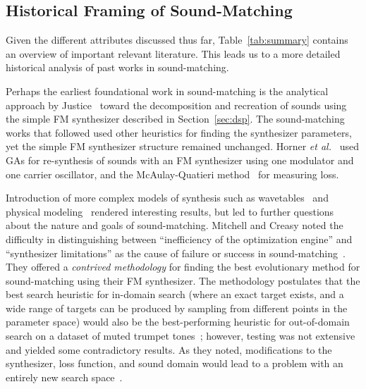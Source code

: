 \subsection{Historical Framing of Sound-Matching}
Given the different attributes discussed thus far, Table~\ref{tab:summary} contains an overview of important relevant literature. This leads us to a more detailed historical analysis of past works in sound-matching.

Perhaps the earliest foundational work in sound-matching is the analytical approach by Justice~\cite{justice1979analytic} toward the decomposition and recreation of sounds using the simple FM synthesizer described in Section~\ref{sec:dsp}. The sound-matching works that followed used other heuristics for finding the synthesizer parameters, yet the simple FM synthesizer structure remained unchanged. Horner \textit{et al.}~\cite{horner1993machine} used GAs for re-synthesis of sounds with an FM synthesizer using one modulator and one carrier oscillator, and the McAulay-Quatieri method~\cite{mcaulay1986speech} for measuring loss. 


Introduction of more complex models of synthesis such as wavetables~\cite{horner2003auto} and physical modeling~\cite{riionheimo2003parameter} rendered interesting results, but led to further questions about the nature and goals of sound-matching. Mitchell and Creasy noted the difficulty in distinguishing between ``inefficiency of the optimization engine'' and ``synthesizer limitations'' as the cause of failure or success in sound-matching~\cite{mitchell2007evolutionary}. They offered a \textit{contrived methodology} for finding the best evolutionary method for sound-matching using their FM synthesizer. The methodology postulates that the best search heuristic for in-domain search (where an exact target exists, and a wide range of targets can be produced by sampling from different points in the parameter space) would also be the best-performing heuristic for out-of-domain search on a dataset of muted trumpet tones~\cite{opolko1989mcgill}; however, testing was not extensive and yielded some contradictory results. As they noted, modifications to the synthesizer, loss function, and sound domain would lead to a problem with an entirely new search space~\cite{mitchell2007evolutionary}. 

